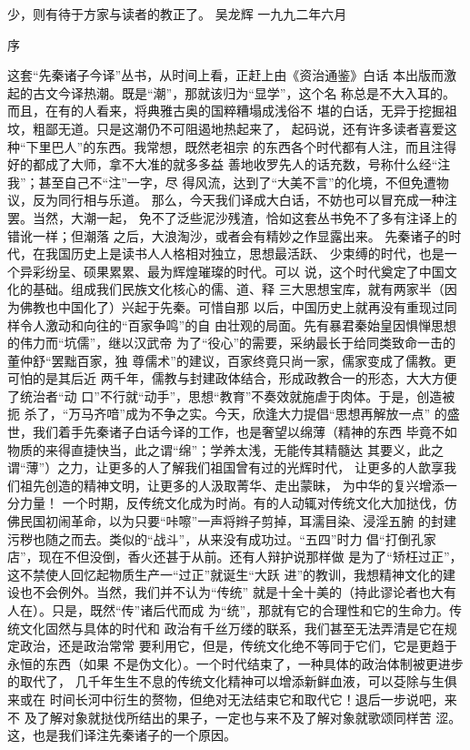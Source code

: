 \documentclass[12pt,UTF8]{ctexbook}
\begin{document}
少，则有待于方家与读者的教正了。 
吴龙辉 一九九二年六月 


序

这套“先秦诸子今译”丛书，从时间上看，正赶上由《资治通鉴》白话 
本出版而激起的古文今译热潮。既是“潮”，那就该归为“显学”，这个名 
称总是不大入耳的。而且，在有的人看来，将典雅古奥的国粹糟塌成浅俗不 
堪的白话，无异于挖掘祖坟，粗鄙无道。只是这潮仍不可阻遏地热起来了， 
起码说，还有许多读者喜爱这种“下里巴人”的东西。我常想，既然老祖宗 
的东西各个时代都有人注，而且注得好的都成了大师，拿不大准的就多多益 
善地收罗先人的话充数，号称什么经“注我”；甚至自己不“注”一字，尽 
得风流，达到了“大美不言”的化境，不但免遭物议，反为同行相与乐道。 
那么，今天我们译成大白话，不妨也可以冒充成一种注罢。当然，大潮一起， 
免不了泛些泥沙残渣，恰如这套丛书免不了多有注译上的错讹一样；但潮落 
之后，大浪淘沙，或者会有精妙之作显露出来。 
先秦诸子的时代，在我国历史上是读书人人格相对独立，思想最活跃、 
少束缚的时代，也是一个异彩纷呈、硕果累累、最为辉煌璀璨的时代。可以 
说，这个时代奠定了中国文化的基础。组成我们民族文化核心的儒、道、释 
三大思想宝库，就有两家半（因为佛教也中国化了）兴起于先秦。可惜自那 
以后，中国历史上就再没有重现过同样令人激动和向往的“百家争鸣”的自 
由壮观的局面。先有暴君秦始皇因惧惮思想的伟力而“坑儒”，继以汉武帝 
为了“役心”的需要，采纳最长于给同类致命一击的董仲舒“罢黜百家，独 
尊儒术”的建议，百家终竟只尚一家，儒家变成了儒教。更可怕的是其后近 
两千年，儒教与封建政体结合，形成政教合一的形态，大大方便了统治者“动 
口”不行就“动手”，思想“教育”不奏效就施虐于肉体。于是，创造被扼 
杀了，“万马齐喑”成为不争之实。今天，欣逢大力提倡“思想再解放一点” 
的盛世，我们着手先秦诸子白话今译的工作，也是奢望以绵薄（精神的东西 
毕竟不如物质的来得直捷快当，此之谓“绵”；学养太浅，无能传其精髓达 
其要义，此之谓“薄”）之力，让更多的人了解我们祖国曾有过的光辉时代， 
让更多的人歆享我们祖先创造的精神文明，让更多的人汲取菁华、走出蒙昧， 
为中华的复兴增添一分力量！ 
一个时期，反传统文化成为时尚。有的人动辄对传统文化大加挞伐，仿 
佛民国初闹革命，以为只要“咔嚓”一声将辫子剪掉，耳濡目染、浸淫五腑 
的封建污秽也随之而去。类似的“战斗”，从来没有成功过。“五四”时力 
倡“打倒孔家店”，现在不但没倒，香火还甚于从前。还有人辩护说那样做 
是为了“矫枉过正”，这不禁使人回忆起物质生产一“过正”就诞生“大跃 
进”的教训，我想精神文化的建设也不会例外。当然，我们并不认为“传统” 
就是十全十美的（持此谬论者也大有人在）。只是，既然“传”诸后代而成 
为“统”，那就有它的合理性和它的生命力。传统文化固然与具体的时代和 
政治有千丝万缕的联系，我们甚至无法弄清是它在规定政治，还是政治常常 
要利用它，但是，传统文化绝不等同于它们，它是更趋于永恒的东西（如果 
不是伪文化）。一个时代结束了，一种具体的政治体制被更进步的取代了， 
几千年生生不息的传统文化精神可以增添新鲜血液，可以芟除与生俱来或在 
时间长河中衍生的赘物，但绝对无法结束它和取代它！退后一步说吧，来不 
及了解对象就挞伐所结出的果子，一定也与来不及了解对象就歌颂同样苦 
涩。这，也是我们译注先秦诸子的一个原因。 
\end{document}

